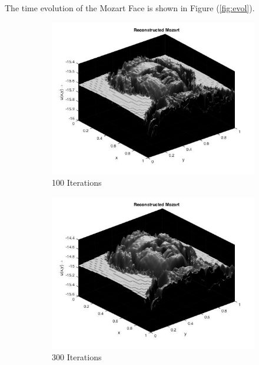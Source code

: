 \noindent
The time evolution of the Mozart Face is shown in Figure (\ref{fig:evol}). 
\begin{center}
	\begin{figure}
		\begin{subfigure}{0.5\textwidth}
			\centering
			\includegraphics[scale = 0.4]{Images/moz/moz_100.jpg}
			\caption{100 Iterations}
		\end{subfigure}
		\begin{subfigure}{0.5\textwidth}
			\centering
			\includegraphics[scale = 0.4]{Images/moz/moz_300.jpg}
			\caption{300 Iterations}
		\end{subfigure}
		\begin{subfigure}{0.5\textwidth}

\end{subfigure}
\end{figure}
\end{center}
